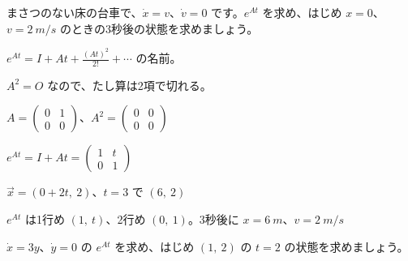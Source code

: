 \begin{reidai}[押したあとの台車]
まさつのない床の台車で、$\dot x=v$、$\dot v=0$ です。$e^{At}$ を求め、はじめ $x=0$、$v=\qty{2}{m/s}$ のときの3秒後の状態を求めましょう。\par
\kangaekata {}\par
{}\enspace $e^{At}=I+At+\frac{(At)^2}{2!}+\cdots$ の名前。\par
{}\enspace $A^2=O$ なので、たし算は2項で切れる。\par
\shiki\kixls{}\zw{} $A=\begin{pmatrix}0&1\\0&0\end{pmatrix}$、$A^2=\begin{pmatrix}0&0\\0&0\end{pmatrix}$\par
\kixla $e^{At}=I+At=\begin{pmatrix}1&t\\0&1\end{pmatrix}$\par
\kixla $\vec x=(0+2t,\ 2)$、$t=3$ で $(6,\ 2)$\par
\kotae $e^{At}$ は1行め $(1,\ t)$、2行め $(0,\ 1)$。3秒後に $x=\qty{6}{m}$、$v=\qty{2}{m/s}$
\end{reidai}

\begin{jibun}
$\dot x=3y$、$\dot y=0$ の $e^{At}$ を求め、はじめ $(1,\ 2)$ の $t=2$ の状態を求めましょう。
\end{jibun}

